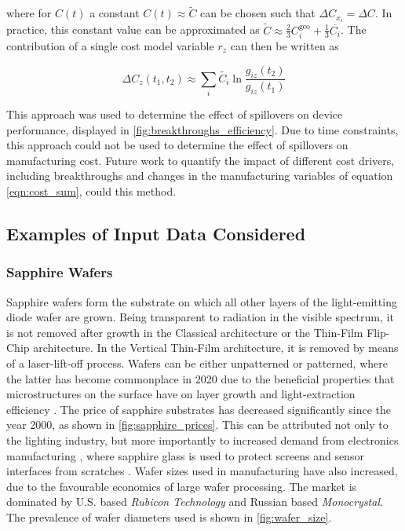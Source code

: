 \documentclass[10pt]{article}
\newcounter{defcounter}
\newenvironment{myequation}{%
\addtocounter{equation}{-1}
\refstepcounter{defcounter}
\renewcommand\theequation{SI\thedefcounter}
\begin{equation}}
{\end{equation}}
\begin{document}
where for $C(t)$ a constant $C(t) \approx \tilde{C} $ can be chosen such that $\Delta C_{x_i} = \Delta C$. In practice, this constant value can be approximated as $\tilde{C} \approx \frac{2}{3} C_i^\text{geo} + \frac{1}{3} \overline{C_i}$. The contribution of a single cost model variable $r_z$ can then be written as

\begin{myequation}
\Delta C_z (t_1,t_2) \approx \sum_i \tilde{C_i} \ln \frac{g_{iz}(t_2)}{g_{iz}(t_1)}
\end{myequation}

This approach was used to determine the effect of spillovers on device performance, displayed in  \cref{fig:breakthroughs_efficiency}. Due to time constraints, this approach could not be used to determine the effect of spillovers on manufacturing cost. Future work to quantify the impact of different cost drivers, including breakthroughs and changes in the manufacturing variables of equation \cref{eqn:cost_sum}, could this method.

\subsection{Examples of Input Data Considered}

\subsubsection{Sapphire Wafers}

Sapphire wafers form the substrate on which all other layers of the light-emitting diode wafer are grown. Being transparent to radiation in the visible spectrum, it is not removed after growth in the Classical architecture or the Thin-Film Flip-Chip architecture. In the Vertical Thin-Film architecture, it is removed by means of a laser-lift-off process. Wafers can be either unpatterned or patterned, where the latter has become commonplace in 2020 due to the beneficial properties that microstructures on the surface have on layer growth \cite{wuu2009defect} and light-extraction efficiency \cite{lee2006enhancing}. The price of sapphire substrates has decreased significantly since the year 2000, as shown in  \cref{fig:sapphire_prices}. This can be attributed not only to the lighting industry, but more importantly to increased demand from electronics manufacturing \cite{yole2015sapphire}, where sapphire glass is used to protect screens and sensor interfaces from scratches \cite{khattak2016world}. Wafer sizes used in manufacturing have also increased, due to the favourable economics of large wafer processing. The market is dominated by U.S. based \textit{Rubicon Technology} and Russian based \textit{Monocrystal}. The prevalence of wafer diameters used is shown in  \cref{fig:wafer_size}.
\end{document}
